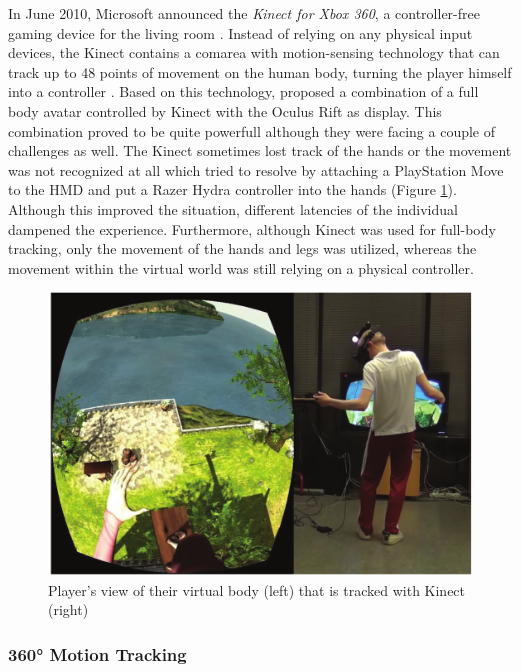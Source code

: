 In June 2010, Microsoft announced the \textit{Kinect for Xbox 360}, a controller-free gaming device for the living room \citep{Microsoft2010}. Instead of relying on any physical input devices, the Kinect contains a comarea with motion-sensing technology that can track up to 48 points of movement on the human body, turning the player himself into a controller \citep{Microsoft2010}. \newline
Based on this technology, \cite{Takala2014} proposed a combination of a full body avatar controlled by Kinect with the Oculus Rift as display. This combination proved to be quite powerfull although they were facing a couple of challenges as well. The Kinect sometimes lost track of the hands or the movement was not recognized at all which \cite{Takala2014} tried to resolve by attaching a PlayStation Move to the HMD and put a Razer Hydra controller into the hands (Figure \ref{fig:kinectbody}). Although this improved the situation, different latencies of the individual dampened the experience. Furthermore, although Kinect was used for full-body tracking, only the movement of the hands and legs was utilized, whereas the movement within the virtual world was still relying on a physical controller.
\begin{figure}[h]
	\begin{center}
		\includegraphics[width=12cm]{03_Figures/05_LitReview/Takala2014_KinectBody.png}
		\caption[Player's view of their virtual body that is tracked with Kinect]{Player's view of their virtual body (left) that is tracked with Kinect (right) \citep{Takala2014}}
		\label{fig:kinectbody}
	\end{center}
\end{figure}


\subsubsection{360° Motion Tracking}

